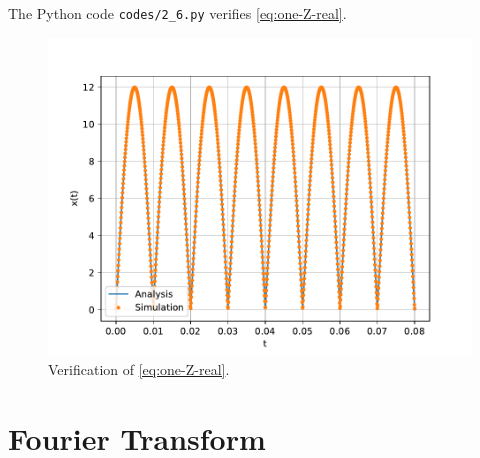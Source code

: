 \documentclass[journal,12pt,twocolumn]{IEEEtran}
\renewcommand\thesection{\arabic{section}}
\begin{document}
\begin{enumerate}[label=\thesection.\arabic*,ref=\thesection.\theenumi]
\solution The Python code \texttt{codes/2\_6.py} verifies \eqref{eq:one-Z-real}.
\begin{figure}[!ht]
    \includegraphics[width=\columnwidth]{figs/2_6.pdf}
    \caption{Verification of \eqref{eq:one-Z-real}.}
    \label{fig:ver-real}
\end{figure}
\end{enumerate}
\section{Fourier Transform}
\end{document}
